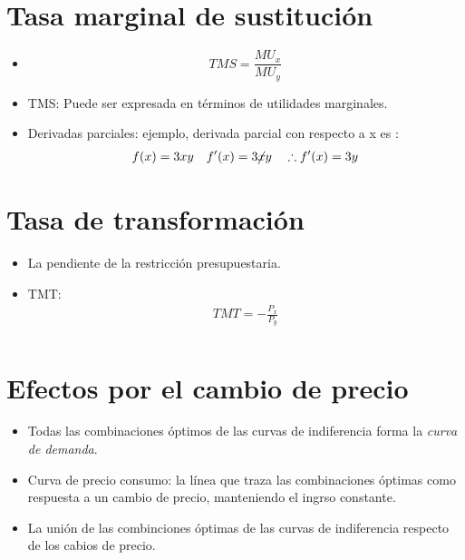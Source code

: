 \section{Tasa marginal de sustitución}
\begin{itemize}
    \item \[
        TMS = \frac{MU_x}{MU_y} 
      \]
    
    \item TMS: Puede ser expresada en términos de utilidades marginales.
    \item Derivadas parciales: ejemplo, derivada parcial con respecto a x es :     
        \begin{align*}
            f(x) = 3x y \quad f'(x) = 3\cancel{x}y \quad \therefore f'(x) = 3y \\ 
        \end{align*}
\end{itemize}


\section{Tasa de transformación}
\begin{itemize}
    \item La pendiente de la restricción presupuestaria.
    \item TMT:
        \begin{align*}
            TMT = -\frac{P_x}{P_y} \\ 
        \end{align*}
\end{itemize}



\section{Efectos por el cambio de precio}
\begin{itemize}
    \item Todas las combinaciones óptimos de las curvas de indiferencia forma la \emph{curva de demanda}.
    \item Curva de precio consumo: la línea que traza las combinaciones óptimas como respuesta a un cambio de precio, manteniendo el ingrso constante. 
    \item La unión de las combinciones óptimas de las curvas de indiferencia respecto de los cabios de precio.
\end{itemize}

